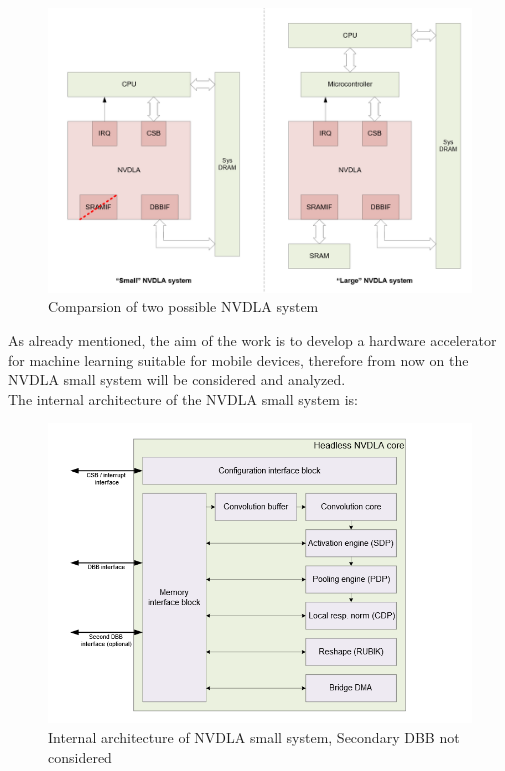 \begin{figure}[!htbp]
\centering
\captionsetup{justification=centering}
\includegraphics[scale=0.4]{./figure/nvdla_system.PNG}
\caption{Comparsion of two possible NVDLA system\cite{WEBSITE:8}}
\label{fig:nvdlasystem}
\end{figure}
As already mentioned, the aim of the work is to develop a hardware accelerator for machine learning suitable for mobile devices, therefore from now on the NVDLA small system will be considered and analyzed.\\
The internal architecture of the NVDLA small system is:
\begin{figure}[!htbp]
\centering
\captionsetup{justification=centering}
\includegraphics[scale=0.5]{./figure/nvdla_internal.PNG}
\centering\caption{Internal architecture of NVDLA small system, Secondary DBB not considered\cite{WEBSITE:8}}
\label{fig:nvdlaarch}
\end{figure}

